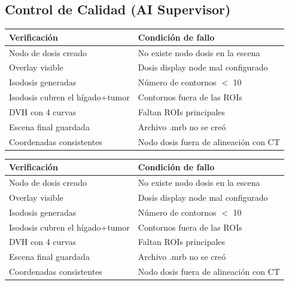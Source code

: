 \documentclass[12pt,a4paper]{article}
\begin{document}
\begin{tcolorbox}[aiSupervisor]
\subsection*{Control de Calidad (AI Supervisor)}

\begin{tabular}{p{5cm} p{10cm}}
\toprule
\textbf{Verificación} & \textbf{Condición de fallo} \\
\midrule
Nodo de dosis creado & No existe nodo dosis en la escena \\
Overlay visible & Dosis display node mal configurado \\
Isodosis generadas & Número de contornos $<$ 10 \\
Isodosis cubren el hígado+tumor & Contornos fuera de las ROIs \\
DVH con 4 curvas & Faltan ROIs principales \\
Escena final guardada & Archivo .mrb no se creó \\
Coordenadas consistentes & Nodo dosis fuera de alineación con CT \\
\bottomrule
\end{tabular}

\newpage




\begin{tabular}{p{5cm} p{10cm}}
\toprule
\textbf{Verificación} & \textbf{Condición de fallo} \\
\midrule
Nodo de dosis creado & No existe nodo dosis en la escena \\
Overlay visible & Dosis display node mal configurado \\
Isodosis generadas & Número de contornos $<$ 10 \\
Isodosis cubren el hígado+tumor & Contornos fuera de las ROIs \\
DVH con 4 curvas & Faltan ROIs principales \\
Escena final guardada & Archivo .mrb no se creó \\
Coordenadas consistentes & Nodo dosis fuera de alineación con CT \\
\bottomrule
\end{tabular}

\newpage

\end{tcolorbox}
\end{document}
